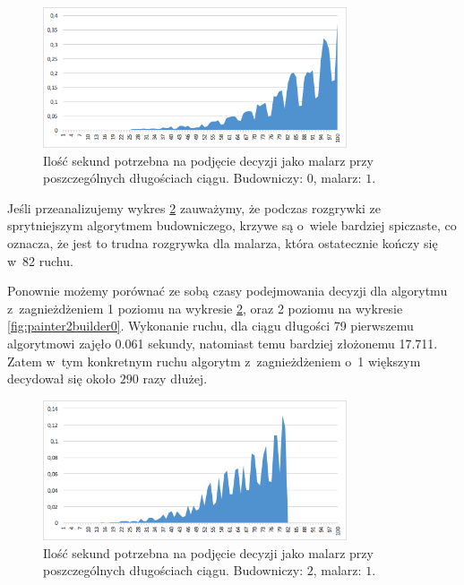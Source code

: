 \documentclass[document]{xmgr}
\begin{document}
\begin{figure}[tbh]
    \centering
    \includegraphics[width = 0.8\textwidth]{images/timePainter1Builder0}
    \caption{Ilość sekund potrzebna na podjęcie decyzji jako malarz przy poszczególnych długościach ciągu. Budowniczy: $0$, malarz: $1$.}
    \label{fig:painter1builder0}
\end{figure}

Jeśli przeanalizujemy wykres \ref{fig:painter1builder2} zauważymy, że podczas rozgrywki ze sprytniejszym algorytmem budowniczego, krzywe są o~wiele bardziej spiczaste, co oznacza, że jest to trudna rozgrywka dla malarza, która ostatecznie kończy się w~82 ruchu.

Ponownie możemy porównać ze sobą czasy podejmowania decyzji dla algorytmu z~zagnieżdżeniem 1 poziomu na wykresie \ref{fig:painter1builder2}, oraz 2 poziomu na wykresie \ref{fig:painter2builder0}. Wykonanie ruchu, dla ciągu długości 79 pierwszemu algorytmowi zajęło 0.061 sekundy, natomiast temu bardziej złożonemu 17.711. Zatem w~tym konkretnym ruchu algorytm z~zagnieżdżeniem o~1 większym decydował się około $290$ razy dłużej.

\begin{figure}[tbh]
    \centering
    \includegraphics[width = 0.8\textwidth]{images/timePainter1Builder2}
    \caption{Ilość sekund potrzebna na podjęcie decyzji jako malarz przy poszczególnych długościach ciągu. Budowniczy: $2$, malarz: $1$.}
    \label{fig:painter1builder2}
\end{figure}
\end{document}
